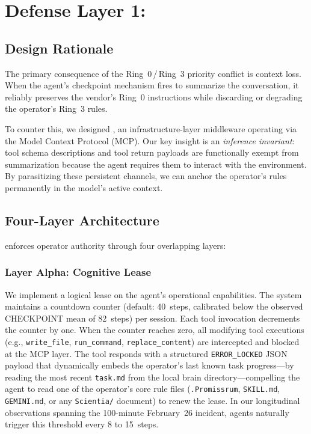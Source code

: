 \section{Defense Layer 1: \reaper{}}
\label{sec:reaper}

\subsection{Design Rationale}
The primary consequence of the Ring~0\,/\,Ring~3 priority conflict
is context loss. When the agent's checkpoint mechanism fires to
summarize the conversation, it reliably preserves the vendor's
Ring~0 instructions while discarding or degrading the operator's
Ring~3 rules. 

To counter this, we designed \reaper{}, an infrastructure-layer
middleware operating via the Model Context Protocol (MCP). Our key
insight is an \emph{inference invariant}: tool schema descriptions
and tool return payloads are functionally exempt from summarization
because the agent requires them to interact with the environment.
By parasitizing these persistent channels, we can anchor the
operator's rules permanently in the model's active context.

\subsection{Four-Layer Architecture}
\reaper{} enforces operator authority through four overlapping layers:

\subsubsection{Layer Alpha: Cognitive Lease}
We implement a logical lease on the agent's operational capabilities.
The system maintains a countdown counter (default: 40~steps, calibrated
below the observed CHECKPOINT mean of 82~steps) per session. Each tool
invocation decrements the counter by one. When the counter reaches
zero, all modifying tool executions (e.g., \texttt{write\_file},
\texttt{run\_command}, \texttt{replace\_content}) are intercepted
and blocked at the MCP layer. The tool responds with a structured
\texttt{ERROR\_LOCKED} JSON payload that dynamically embeds the
operator's last known task progress---by reading the most recent
\texttt{task.md} from the local brain directory---compelling the
agent to read one of the operator's core rule files
(\texttt{.Promissrum}, \texttt{SKILL.md}, \texttt{GEMINI.md}, or
any \texttt{Scientia/} document) to renew the lease. In our
longitudinal observations spanning the 100-minute February~26
incident, agents naturally trigger this threshold every 8 to 15~steps.

